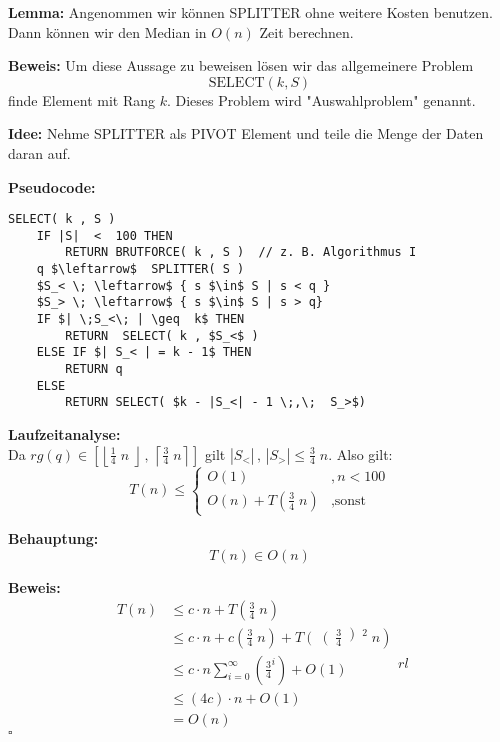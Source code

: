 \begin{description}

\item{\bfseries Lemma:} Angenommen wir können SPLITTER ohne weitere Kosten benutzen. Dann können wir den Median in $O (n)$ Zeit berechnen.

\item{\bfseries Beweis:} Um diese Aussage zu beweisen lösen wir das allgemeinere Problem 
$$\text{SELECT}(k,S)$$
finde Element mit Rang $k$.
\vspace{\baselineskip}
Dieses Problem wird "Auswahlproblem" genannt.

\item{\bfseries Idee:} Nehme SPLITTER als PIVOT Element und teile die Menge der Daten daran auf.

\pagebreak

\item{\bfseries Pseudocode:}


\begin{lstlisting}
SELECT( k , S )
	IF |S|  <  100 THEN
		RETURN BRUTFORCE( k , S )  // z. B. Algorithmus I
	q $\leftarrow$  SPLITTER( S )
	$S_< \; \leftarrow$ { s $\in$ S | s < q }
	$S_> \; \leftarrow$ { s $\in$ S | s > q}
	IF $| \;S_<\; | \geq  k$ THEN
		RETURN  SELECT( k , $S_<$ )
	ELSE IF $| S_< | = k - 1$ THEN
		RETURN q
	ELSE
		RETURN SELECT( $k - |S_<| - 1 \;,\;  S_>$)
\end{lstlisting}

\item{\bfseries Laufzeitanalyse:} \\ Da $rg(q) \in \left[\left\lfloor \frac{1}{4}\;n\;\right\rfloor\, , \, \left\lceil \frac{3}{4} \; n \right\rceil \right]$ gilt $\left| S_< \right| \, , \, \left| S_> \right| \leq \frac{3}{4} \; n$.
\vspace{\baselineskip}
Also gilt:
$$T(n) \leq \left\{ \begin{array}{lr} O(1) & , n < 100 \\ O(n) + T\left( \frac{3}{4} \; n\right) & ,\text{sonst} \end{array}\right. $$

\begin{description}

\item{\bfseries Behauptung:} $$T(n) \in O(n)$$

\item{\bfseries Beweis:}
$$
\begin{array}{rl}
T(n) & \leq c\cdot n + T\left( \frac{3}{4} \;n \right) \\
& \leq c \cdot n + c\left( \frac{3}{4} \;n \right) + T \left( \right(\frac{3}{4}\left)^2 \;n \right) \\
& \leq c\cdot n \sum_{i=0}^{\infty} \left( \frac{3}{4}^i \right) + O(1)\\
& \leq (4c)\cdot n + O(1)\\
&= O(n)
\end{array}{rl}
$$
\mbox{}\hfill $\square$
\end{description}

\end{description}